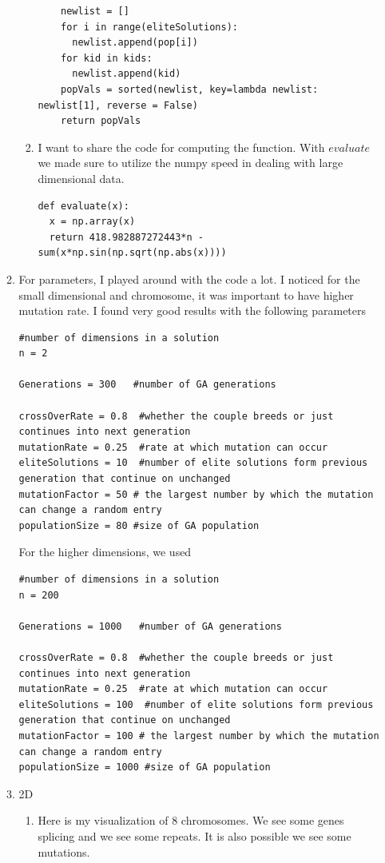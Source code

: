 \documentclass[11pt]{article}
\begin{document}
\begin{enumerate}
\begin{enumerate}
\begin{enumerate}
\begin{verbatim}
    newlist = []
    for i in range(eliteSolutions):
      newlist.append(pop[i])
    for kid in kids:
      newlist.append(kid)
    popVals = sorted(newlist, key=lambda newlist: newlist[1], reverse = False)
    return popVals

\end{verbatim}
\item I want to share the code for computing the function.  With $evaluate$ we made sure to utilize the numpy speed in dealing with large dimensional data.
\begin{verbatim}
def evaluate(x):
  x = np.array(x)
  return 418.982887272443*n -sum(x*np.sin(np.sqrt(np.abs(x))))
\end{verbatim}
\end{enumerate}
\item For parameters, I played around with the code a lot.  I noticed for the small dimensional and chromosome, it was important to have higher mutation rate.  I found very good results with the following parameters 
\begin{verbatim}
#number of dimensions in a solution
n = 2

Generations = 300   #number of GA generations

crossOverRate = 0.8  #whether the couple breeds or just continues into next generation
mutationRate = 0.25  #rate at which mutation can occur
eliteSolutions = 10  #number of elite solutions form previous generation that continue on unchanged
mutationFactor = 50 # the largest number by which the mutation can change a random entry
populationSize = 80 #size of GA population
\end{verbatim}

For the higher dimensions, we used 

\begin{verbatim}
#number of dimensions in a solution
n = 200

Generations = 1000   #number of GA generations

crossOverRate = 0.8  #whether the couple breeds or just continues into next generation
mutationRate = 0.25  #rate at which mutation can occur
eliteSolutions = 100  #number of elite solutions form previous generation that continue on unchanged
mutationFactor = 100 # the largest number by which the mutation can change a random entry
populationSize = 1000 #size of GA population
\end{verbatim}
\item 2D
\begin{enumerate}
\item Here is my visualization of 8 chromosomes.  We see some genes splicing and we see some repeats.  It is also possible we see some mutations.


\end{enumerate}
\end{enumerate}
\end{enumerate}
\end{document}
